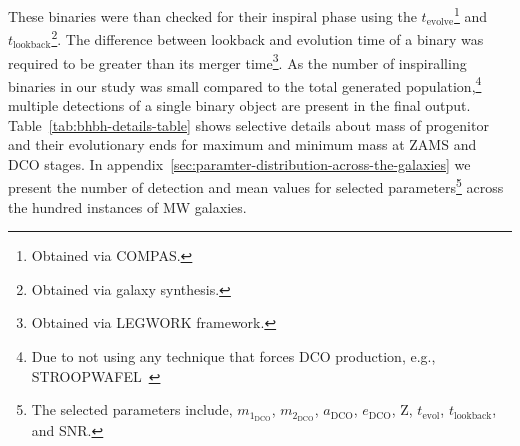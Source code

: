\documentclass[journal, twocolumn]{IEEEtran}
\newcommand{\mone}[1]{m_{1_{\text{#1}}}}
\newcommand{\mtwo}[1]{m_{2_{\text{#1}}}}
\newcommand{\semaxis}[1]{a_{\text{#1}}}
\newcommand{\ecc}[1]{e_\text{#1}}
\newcommand{\interval}[1]{t_\text{#1}}
\begin{document}
    These binaries were than checked for their inspiral phase using the $\interval{evolve}$\footnote{Obtained via COMPAS.} and $\interval{lookback}$\footnote{Obtained via galaxy synthesis.}.
    The difference between lookback and evolution time of a binary was required to be greater than its merger time\footnote{Obtained via LEGWORK framework.}.
    As the number of inspiralling binaries in our study was small compared to the total generated population,\footnote{Due to not using any technique that forces DCO production, e.g., STROOPWAFEL~\cite{Broekgaarden2019}} multiple detections of a single binary object are present in the final output.
    Table~\ref{tab:bhbh-details-table} shows selective details about mass of progenitor and their evolutionary ends for maximum and minimum mass at ZAMS and DCO stages. In appendix~\ref{sec:paramter-distribution-across-the-galaxies} we present the number of detection and mean values for selected parameters\footnote{The selected  parameters include, $\mone{DCO}$, $\mtwo{DCO}$, $\semaxis{DCO}$, $\ecc{DCO}$, Z, $\interval{evol}$, $\interval{lookback}$, and SNR.} across the hundred instances of MW galaxies.
    
\end{document}
